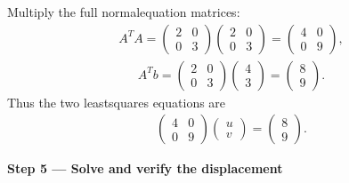 \documentclass[letterpaper,11pt,english,openany,oneside]{jupyterBook}
\begin{document}
\sphinxAtStartPar
Multiply the full normal\sphinxhyphen{}equation matrices:
{\color{QuizMathBlue} \begin{equation*}
\begin{split}
A^TA=\begin{pmatrix}2&0\\0&3\end{pmatrix}\begin{pmatrix}2&0\\0&3\end{pmatrix}=\begin{pmatrix}4&0\\0&9\end{pmatrix},
\end{split}
\end{equation*}}{\color{QuizMathBlue} \begin{equation*}
\begin{split}
A^Tb=\begin{pmatrix}2&0\\0&3\end{pmatrix}\begin{pmatrix}4\\3\end{pmatrix}=\begin{pmatrix}8\\9\end{pmatrix}.
\end{split}
\end{equation*}}
\sphinxAtStartPar
Thus the two least\sphinxhyphen{}squares equations are
{\color{QuizMathBlue} \begin{equation*}
\begin{split}
\begin{pmatrix}4&0\\0&9\end{pmatrix}\begin{pmatrix}u\\v\end{pmatrix}=\begin{pmatrix}8\\9\end{pmatrix}.
\end{split}
\end{equation*}}
\par

\par\medskip{}
{\color{QuizStepRed}\bfseries Step 5 — Solve and verify the displacement}\par\smallskip
\end{document}
